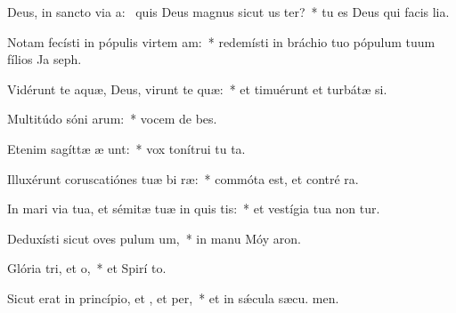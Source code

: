 \item Deus, in sancto via a:~\pscross{} quis Deus magnus sicut us ter?~* tu es Deus qui facis lia.
\item Notam fecísti in pópulis virtem am:~* redemísti in bráchio tuo pópulum tuum fílios Ja  seph.
\item Vidérunt te aquæ, Deus, virunt te quæ:~* et timuérunt et turbátæ  si.
\item Multitúdo sóni arum:~* vocem de bes.
\item Etenim sagíttæ æ unt:~* vox tonítrui tu  ta.
\item Illuxérunt coruscatiónes tuæ bi ræ:~* commóta est, et contré ra.
\item In mari via tua, et sémitæ tuæ in quis tis:~* et vestígia tua non tur.
\item Deduxísti sicut oves pulum um,~* in manu Móy  aron.
\item Glória tri, et o,~* et Spirí to.
\item Sicut erat in princípio, et , et per,~* et in sǽcula sæcu. men.
